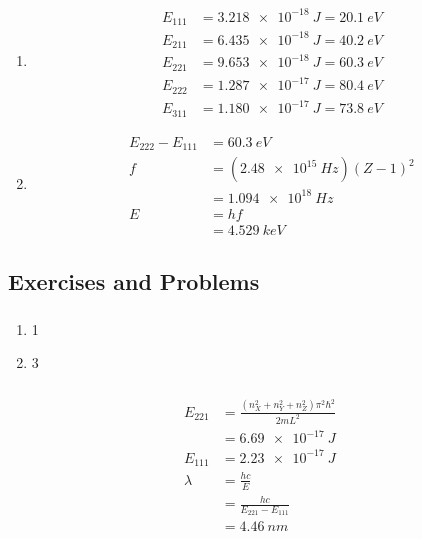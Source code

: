 \documentclass{article}
\begin{document}
\begin{enumerate}
  \item

        \begin{align*}
          E_{111} & = \qty{3.218e-18}{J} = \qty{20.1}{eV} \\
          E_{211} & = \qty{6.435e-18}{J} = \qty{40.2}{eV} \\
          E_{221} & = \qty{9.653e-18}{J} = \qty{60.3}{eV} \\
          E_{222} & = \qty{1.287e-17}{J} = \qty{80.4}{eV} \\
          E_{311} & = \qty{1.180e-17}{J} = \qty{73.8}{eV}
        \end{align*}

  \item

        \begin{align*}
          E_{222} - E_{111} & = \qty{60.3}{eV}                \\
          f                 & = (\qty{2.48e15}{Hz}) (Z - 1)^2 \\
                            & = \qty{1.094e18}{Hz}            \\
          E                 & = h f                           \\
                            & = \qty{4.529}{keV}
        \end{align*}
\end{enumerate}

\subsection{Exercises and Problems}

\subsubsection{}

\begin{enumerate}
  \item 1

  \item 3
\end{enumerate}

\setcounter{subsubsection}{2}
\subsubsection{}

\begin{align*}
  E_{221} & = \frac{(n_X^2 + n_Y^2 + n_Z^2) \pi^2 \hbar^2}{2 m L^2} \\
          & = \qty{6.69e-17}{J}                                     \\
  E_{111} & = \qty{2.23e-17}{J}                                     \\
  \lambda & = \frac{h c}{E}                                         \\
          & = \frac{h c}{E_{221} - E_{111}}                         \\
          & = \qty{4.46}{nm}
\end{align*}
\end{document}
